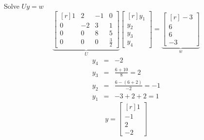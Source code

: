\documentclass{jhwhw}
\begin{document}
Solve \(Uy = w\)
\[
   \underbrace{\begin{bmatrix*}[r]
	  1     &    2    &    -1   &  0 \\
	  0     &   -2    &     3   &  1 \\
	  0     &    0    &     8   &  5 \\
	  0     &    0    &     0   &  \frac{3}{2} 
	\end{bmatrix*}}_{U}
	\begin{bmatrix*}[r]
	   y_1  \\
	   y_2  \\
	   y_3  \\
	   y_4 
	\end{bmatrix*}
	 =
	\underbrace{\begin{bmatrix*}[r]
	   -3  \\
	    6  \\
	    6  \\
	   -3 
	 \end{bmatrix*}}_{w}
\]
\begin{eqnarray*}
  y_4 &=& -2 \nonumber \\
  y_3 &=& \frac{6+10}{8}  = 2\nonumber \\
  y_2 &=& \frac{6 - (6+2)}{-2}  = -1\nonumber \\
  y_1 &=& -3 + 2 + 2 = 1\nonumber 
\end{eqnarray*}
\[
y
	 =
	\begin{bmatrix*}[r]
	    1  \\
	   -1  \\
	    2  \\
	   -2 
	 \end{bmatrix*}
\]
\end{document}
